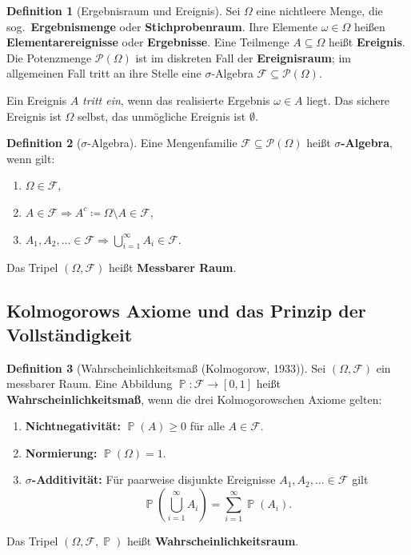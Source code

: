 ﻿\documentclass[12pt,a4paper]{article}
\theoremstyle{definition}
\newtheorem{definition}{Definition}[section]
\theoremstyle{plain}
\theoremstyle{remark}
\DeclareMathOperator{\Prob}{\mathbb{P}}
\begin{document}
\begin{definition}[Ergebnisraum und Ereignis]\label{def:ergebnisraum}
  Sei $\Omega$ eine nichtleere Menge, die sog.\ \textbf{Ergebnismenge} oder
  \textbf{Stichprobenraum}. Ihre Elemente $\omega \in \Omega$ heißen
  \textbf{Elementarereignisse} oder \textbf{Ergebnisse}. Eine Teilmenge
  $A \subseteq \Omega$ heißt \textbf{Ereignis}. Die Potenzmenge
  $\mathcal{P}(\Omega)$ ist im diskreten Fall der \textbf{Ereignisraum};
  im allgemeinen Fall tritt an ihre Stelle eine $\sigma$-Algebra
  $\mathcal{F} \subseteq \mathcal{P}(\Omega)$.
\end{definition}

Ein Ereignis $A$ \emph{tritt ein}, wenn das realisierte Ergebnis
$\omega \in A$ liegt. Das sichere Ereignis ist $\Omega$ selbst, das
unmögliche Ereignis ist $\emptyset$.

\begin{definition}[$\sigma$-Algebra]\label{def:sigma-algebra}
  Eine Mengenfamilie $\mathcal{F} \subseteq \mathcal{P}(\Omega)$ heißt
  \textbf{$\sigma$-Algebra}, wenn gilt:
  \begin{enumerate}[label=(\roman*)]
    \item $\Omega \in \mathcal{F}$,
    \item $A \in \mathcal{F} \Rightarrow A^c \coloneqq \Omega \setminus A \in \mathcal{F}$,
    \item $A_1, A_2, \ldots \in \mathcal{F} \Rightarrow \bigcup_{i=1}^{\infty} A_i \in \mathcal{F}$.
  \end{enumerate}
  Das Tripel $(\Omega, \mathcal{F})$ heißt \textbf{Messbarer Raum}.
\end{definition}

\subsection{Kolmogorows Axiome und das Prinzip der Vollständigkeit}
\label{subsec:axiome}

\begin{definition}[Wahrscheinlichkeitsmaß (Kolmogorow, 1933)]\label{def:wmaß}
  Sei $(\Omega, \mathcal{F})$ ein messbarer Raum. Eine Abbildung
  $\Prob\colon \mathcal{F} \to [0,1]$ heißt \textbf{Wahrscheinlichkeitsmaß},
  wenn die drei Kolmogorowschen Axiome gelten:
  \begin{enumerate}[label=\textbf{(K\arabic*)}]
    \item \textbf{Nichtnegativität:} $\Prob(A) \geq 0$ für alle $A \in \mathcal{F}$.
    \item \textbf{Normierung:} $\Prob(\Omega) = 1$.
    \item \textbf{$\sigma$-Additivität:} Für paarweise disjunkte Ereignisse
      $A_1, A_2, \ldots \in \mathcal{F}$ gilt
      \[
        \Prob\!\left(\bigcup_{i=1}^{\infty} A_i\right) = \sum_{i=1}^{\infty} \Prob(A_i).
      \]
  \end{enumerate}
  Das Tripel $(\Omega, \mathcal{F}, \Prob)$ heißt \textbf{Wahrscheinlichkeitsraum}.
\end{definition}
\end{document}
